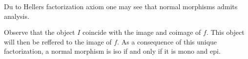     \begin{remark}
        Du to Hellers factorization axiom one may see that normal morphisms admits analysis.

        \begin{center}
        \end{center}

        Observe that the object $I$ coincide with the image and coimage of $f$. This object will then be reffered to the image of $f$. As a consequence of this unique factorization, a normal morphism is iso if and only if it is mono and epi.
    \end{remark}

